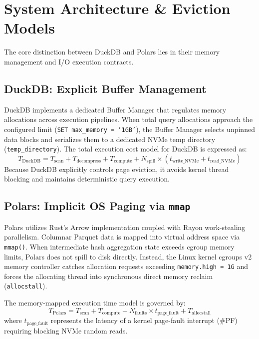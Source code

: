 \documentclass[sigconf,nonacm]{acmart}
\begin{document}
\section{System Architecture \& Eviction Models}
The core distinction between DuckDB and Polars lies in their memory management and I/O execution contracts.

\subsection{DuckDB: Explicit Buffer Management}
DuckDB implements a dedicated Buffer Manager that regulates memory allocations across execution pipelines. When total query allocations approach the configured limit (\texttt{SET max\_memory = '1GB'}), the Buffer Manager selects unpinned data blocks and serializes them to a dedicated NVMe temp directory (\texttt{temp\_directory}).
The total execution cost model for DuckDB is expressed as:
\begin{equation}
T_{\text{DuckDB}} = T_{\text{scan}} + T_{\text{decompress}} + T_{\text{compute}} + N_{\text{spill}} \times (t_{\text{write\_NVMe}} + t_{\text{read\_NVMe}})
\end{equation}
Because DuckDB explicitly controls page eviction, it avoids kernel thread blocking and maintains deterministic query execution.

\subsection{Polars: Implicit OS Paging via \texttt{mmap}}
Polars utilizes Rust's Arrow implementation coupled with Rayon work-stealing parallelism. Columnar Parquet data is mapped into virtual address space via \texttt{mmap()}. When intermediate hash aggregation state exceeds cgroup memory limits, Polars does not spill to disk directly. Instead, the Linux kernel cgroups v2 memory controller catches allocation requests exceeding \texttt{memory.high = 1G} and forces the allocating thread into synchronous direct memory reclaim (\texttt{allocstall}).

The memory-mapped execution time model is governed by:
\begin{equation}
T_{\text{Polars}} = T_{\text{scan}} + T_{\text{compute}} + N_{\text{faults}} \times t_{\text{page\_fault}} + T_{\text{allocstall}}
\end{equation}
where $t_{\text{page\_fault}}$ represents the latency of a kernel page-fault interrupt (\#PF) requiring blocking NVMe random reads.
\end{document}
